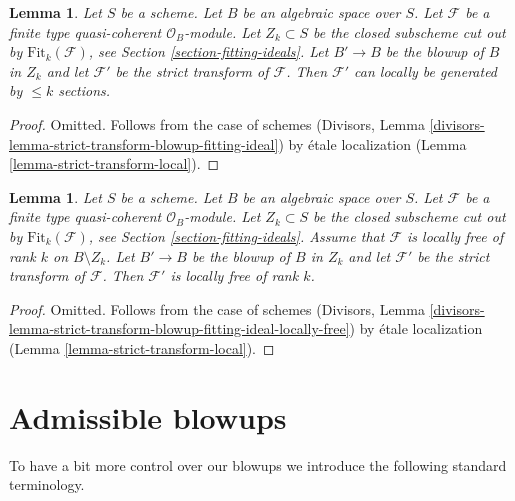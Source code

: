 \documentclass{stacks-project}
\theoremstyle{plain}
\newtheorem{lemma}[subsection]{Lemma}
\theoremstyle{definition}
\theoremstyle{remark}
\numberwithin{equation}{subsection}
\begin{document}
\begin{lemma}
\label{lemma-strict-transform-blowup-fitting-ideal}
Let $S$ be a scheme. Let $B$ be an algebraic space over $S$.
Let $\mathcal{F}$ be a finite type quasi-coherent $\mathcal{O}_B$-module.
Let $Z_k \subset S$ be the closed subscheme cut out by
$\text{Fit}_k(\mathcal{F})$, see Section \ref{section-fitting-ideals}.
Let $B' \to B$ be the blowup of $B$ in $Z_k$ and let
$\mathcal{F}'$ be the strict transform of $\mathcal{F}$.
Then $\mathcal{F}'$ can locally be generated by $\leq k$
sections.
\end{lemma}

\begin{proof}
Omitted. Follows from the case of schemes
(Divisors, Lemma \ref{divisors-lemma-strict-transform-blowup-fitting-ideal})
by \'etale localization (Lemma \ref{lemma-strict-transform-local}).
\end{proof}

\begin{lemma}
\label{lemma-strict-transform-blowup-fitting-ideal-locally-free}
Let $S$ be a scheme. Let $B$ be an algebraic space over $S$.
Let $\mathcal{F}$ be a finite type quasi-coherent $\mathcal{O}_B$-module.
Let $Z_k \subset S$ be the closed subscheme cut out by
$\text{Fit}_k(\mathcal{F})$, see Section \ref{section-fitting-ideals}.
Assume that $\mathcal{F}$ is locally free of rank $k$ on $B \setminus Z_k$.
Let $B' \to B$ be the blowup of $B$ in $Z_k$ and let
$\mathcal{F}'$ be the strict transform of $\mathcal{F}$.
Then $\mathcal{F}'$ is locally free of rank $k$.
\end{lemma}

\begin{proof}
Omitted. Follows from the case of schemes
(Divisors, Lemma
\ref{divisors-lemma-strict-transform-blowup-fitting-ideal-locally-free})
by \'etale localization (Lemma \ref{lemma-strict-transform-local}).
\end{proof}












\section{Admissible blowups}
\label{section-admissible-blowups}

\noindent
To have a bit more control over our blowups we introduce the following
standard terminology.
\end{document}

